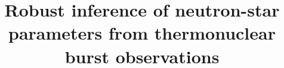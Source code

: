 \documentclass{aastex63}
\begin{document}
\title{Robust inference of neutron-star parameters from thermonuclear burst 
observations}


\end{document}
